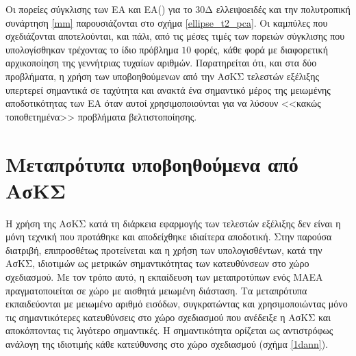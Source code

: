 Οι πορείες σύγκλισης των ΕΑ και ΕΑ() για το $30$Δ ελλειψοειδές και την πολυτροπική συνάρτηση \ref{mm} παρουσιάζονται στο σχήμα \ref{ellipse_t2_pca}. Οι καμπύλες που σχεδιάζονται αποτελούνται, και πάλι, από τις μέσες τιμές των πορειών σύγκλισης που υπολογίσθηκαν τρέχοντας το ίδιο πρόβλημα $10$ φορές, κάθε φορά με διαφορετική αρχικοποίηση της γεννήτριας τυχαίων αριθμών.  Παρατηρείται ότι, και στα δύο προβλήματα, η χρήση των υποβοηθούμενων από την ΑσΚΣ τελεστών εξέλιξης υπερτερεί σημαντικά σε ταχύτητα και ανακτά ένα σημαντικό μέρος της μειωμένης αποδοτικότητας των ΕΑ όταν αυτοί χρησιμοποιούνται για να λύσουν <<κακώς τοποθετημένα>> προβλήματα βελτιστοποίησης. 


\section{Μεταπρότυπα υποβοηθούμενα από ΑσΚΣ}
Η χρήση της ΑσΚΣ κατά τη διάρκεια εφαρμογής των τελεστών εξέλιξης δεν είναι η μόνη τεχνική που προτάθηκε και αποδείχθηκε ιδιαίτερα αποδοτική. Στην παρούσα διατριβή, επιπροσθέτως προτείνεται και η χρήση των υπολογισθέντων, κατά την ΑσΚΣ, ιδιοτιμών ως μετρικών σημαντικότητας των κατευθύνσεων στο χώρο σχεδιασμού. Με τον τρόπο αυτό, η εκπαίδευση των μεταπροτύπων ενός ΜΑΕΑ πραγματοποιείται σε χώρο με αισθητά μειωμένη διάσταση. Τα μεταπρότυπα εκπαιδεύονται με μειωμένο αριθμό εισόδων, συγκρατώντας και χρησιμοποιώντας μόνο τις σημαντικότερες κατευθύνσεις στο χώρο σχεδιασμού που ανέδειξε η ΑσΚΣ και αποκόπτοντας τις λιγότερο σημαντικές. Η σημαντικότητα ορίζεται ως αντιστρόφως ανάλογη της ιδιοτιμής κάθε κατεύθυνσης στο χώρο σχεδιασμού (σχήμα \ref{1dann}).              

